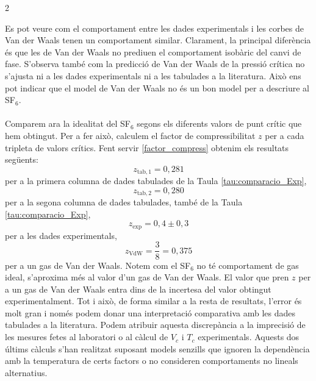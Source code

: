 \documentclass[12pt,twosides,onecolumn,openany]{article}
\newenvironment{Figura}
  {\par\medskip\noindent\minipage{\linewidth}}
  {\endminipage\par\medskip}
\begin{document}
\begin{multicols}{2}
\begin{Figura}
  \label{fig:comparacio_VdW}
\end{Figura}
Es pot veure com el comportament entre les dades experimentals i les corbes de Van der Waals tenen un comportament similar. Clarament, la principal diferència és que les de Van der Waals no prediuen el comportament isobàric del canvi de fase. S'observa també com la predicció de Van der Waals de la pressió crítica no s'ajusta ni a les dades experimentals ni a les tabulades a la literatura. Això ens pot indicar que el model de Van der Waals no és un bon model per a descriure al SF$_6$.\\\\
Comparem ara la idealitat del SF$_6$ segons els diferents valors de punt crític que hem obtingut. Per a fer això, calculem el factor de compressibilitat $z$ per a cada tripleta de valors crítics. Fent servir \eqref{factor_compress} obtenim els resultats següents:
\begin{equation*}
  z_{\text{tab},1} = 0,281
\end{equation*}
per a la primera columna de dades tabulades de la Taula \ref{tau:comparacio_Exp},
\begin{equation*}
  z_{\text{tab},2} = 0,280
\end{equation*}
per a la segona columna de dades tabulades, també de la Taula \ref{tau:comparacio_Exp},
\begin{equation*}
  z_{\text{exp}} = 0,4\pm0,3
\end{equation*}
per a les dades experimentals,
\begin{equation*}
  z_{\text{VdW}} = \frac{3}{8} = 0,375
\end{equation*}
per a un gas de Van der Waals. Notem com el SF$_6$ no té comportament de gas ideal, s'aproxima més al valor d'un gas de Van der Waals. El valor que pren $z$ per a un gas de Van der Waals entra dins de la incertesa del valor obtingut experimentalment. Tot i això, de forma similar a la resta de resultats, l'error és molt gran i només podem donar una interpretació comparativa amb les dades tabulades a la literatura. Podem atribuir aquesta discrepància a la imprecisió de les mesures fetes al laboratori o al càlcul de $V_c$ i $T_c$ experimentals. Aquests dos últims càlculs s'han realitzat suposant models senzills que ignoren la dependència amb la temperatura de certs factors o no consideren comportaments no lineals alternatius.\\\\

\end{multicols}
\end{document}
